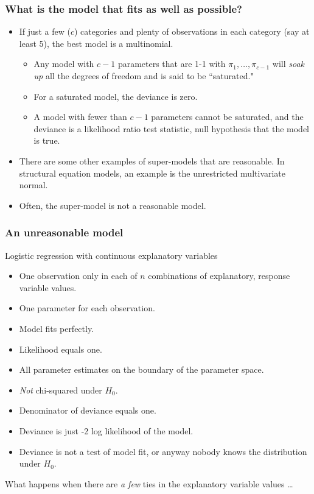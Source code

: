 \documentclass[serif]{beamer} %
\begin{document}
\begin{frame}
\frametitle{What is the model that fits as well as possible?}
  \begin{itemize}
    \item If just a few ($c$) categories and plenty of observations in each category (say at least 5), the best model is a multinomial. 
        \begin{itemize}
            \item Any model with $c-1$ parameters that are 1-1 with $\pi_1, \ldots, \pi_{c-1}$ will \emph{soak up} all the degrees of freedom and is said to be ``saturated."
            \item For a saturated model, the deviance is zero.
            \item A model with fewer than $c-1$ parameters cannot be saturated, and the deviance is a likelihood ratio test statistic, null hypothesis that the model is true.
        \end{itemize}
    \item There are some other examples of super-models that are reasonable. In structural equation models, an example is the unrestricted multivariate normal.
    \item Often, the super-model is not a reasonable model.
  \end{itemize}
\end{frame}

\begin{frame}
\frametitle{An unreasonable model}
Logistic regression with continuous explanatory variables
  \begin{itemize}
    \item One observation only in each of $n$ combinations of explanatory, response variable values.
    \item One parameter for each observation.
    \item Model fits perfectly.
    \item Likelihood equals one.
    \item All parameter estimates on the boundary of the parameter space.
    \item \emph{Not} chi-squared under $H_0$.
    \item Denominator of deviance equals one.
    \item Deviance is just -2 log likelihood of the model.
    \item Deviance is not a test of model fit, or anyway nobody knows the distribution under $H_0$.
  \end{itemize}
What happens when there are \emph{a few} ties in the explanatory variable values \ldots
\end{frame}
\end{document}
